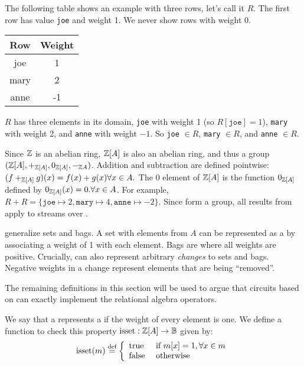The following table shows an example \zr with three rows, let's call
it $R$.  The first row has value \texttt{joe} and weight 1.  We never
show rows with weight 0.
%
\begin{center}
\begin{tabular}{|c|c|}\hline
  Row & Weight \\ \hline
  joe & 1 \\
  mary & 2 \\
  anne & -1 \\ \hline
\end{tabular}
\end{center}

$R$ has three elements in its domain, \texttt{joe} with weight 1 (so
$R[\texttt{joe}] = 1$), \texttt{mary} with weight 2, and \texttt{anne}
with weight $-1$.  So \texttt{joe} $\in R$, \texttt{mary} $\in R$,
and \texttt{anne} $\in R$.

Since $\mathbb{Z}$ is an abelian ring, $\mathbb{Z}[A]$ is also an abelian ring, and
thus a group $(\mathbb{Z}[A], +_{\mathbb{Z}[A]}, 0_{\mathbb{Z}[A]}, -_{\mathbb{Z}{A}})$.  Addition and
subtraction are defined pointwise: $(f +_{\mathbb{Z}[A]} g)(x) = f(x) + g(x)
\forall x \in A.$ The $0$ element of $\mathbb{Z}[A]$ is the function
$0_{\mathbb{Z}[A]}$ defined by $0_{\mathbb{Z}[A]}(x) = 0 .  \forall x \in A$.  For
example, $R + R = \{ \texttt{joe} \mapsto 2, \texttt{mary} \mapsto 4,
\texttt{anne} \mapsto -2 \}$.  Since \zrs form a group, all results
from  apply to streams over \zrs.

\zrs generalize sets and bags.  A set with elements from $A$
can be represented as a \zr by associating a weight of 1 with each element.
Bags are \zrs where all weights are positive.  Crucially, \zrs
can also represent arbitrary \emph{changes} to sets and bags.
Negative weights in a change represent elements that are being ``removed''.

The remaining definitions in this section will be used to argue that
circuits based on \zrs can exactly implement the relational algebra
operators.

\begin{definition}
We say that a \zr represents a  if the weight of every
element is one.  We define a function to check this property
$\mbox{isset} : \mathbb{Z}[A] \rightarrow \mathbb{B}$
given by:
$$\mbox{isset}(m) \stackrel{\textrm{\scriptsize def}}{=} \left\{
\begin{array}{ll}
  \mbox{true} & \mbox{ if } m[x] = 1, \forall x \in m \\
  \mbox{false} & \mbox{ otherwise}
\end{array}
\right.
$$
\end{definition}

